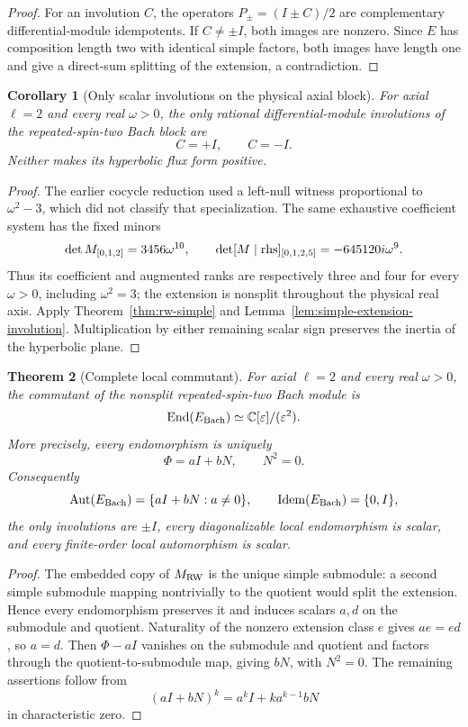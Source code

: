 \documentclass[11pt]{article}
\newtheorem{theorem}{Theorem}[section]
\newtheorem{corollary}[theorem]{Corollary}
\theoremstyle{definition}
\theoremstyle{remark}
\newcommand{\C}{\mathbb C}
\begin{document}
\begin{proof}
For an involution \(C\), the operators
\(P_\pm=(I\pm C)/2\) are complementary differential-module idempotents.
If \(C\ne\pm I\), both images are nonzero.  Since \(E\) has composition
length two with identical simple factors, both images have length one and
give a direct-sum splitting of the extension, a contradiction.
\end{proof}

\begin{corollary}[Only scalar involutions on the physical axial block]
\label{cor:only-scalar-c}
For axial \(\ell=2\) and every real \(\omega>0\), the only rational
differential-module involutions of the repeated-spin-two Bach block are
\[
C=+I,\qquad C=-I.
\]
Neither makes its hyperbolic flux form positive.
\end{corollary}

\begin{proof}
The earlier cocycle reduction used a left-null witness proportional to
\(\omega^2-3\), which did not classify that specialization.  The same
exhaustive coefficient system has the fixed minors
\[
\det M_{[0,1,2]}=3456\omega^{10},
\qquad
\det[M\mid{\rm rhs}]_{[0,1,2,5]}
=-645120i\omega^9.
\]
Thus its coefficient and augmented ranks are respectively three and four
for every \(\omega>0\), including \(\omega^2=3\); the extension is nonsplit
throughout the physical real axis.  Apply
Theorem~\ref{thm:rw-simple} and
Lemma~\ref{lem:simple-extension-involution}.  Multiplication by either
remaining scalar sign preserves the inertia of the hyperbolic plane.
\end{proof}

\begin{theorem}[Complete local commutant]
\label{thm:local-commutant}
For axial \(\ell=2\) and every real \(\omega>0\), the commutant of the
nonsplit repeated-spin-two Bach module is
\[
\operatorname{End}(E_{\rm Bach})
\simeq
\C[\varepsilon]/(\varepsilon^2).
\]
More precisely, every endomorphism is uniquely
\[
\Phi=aI+bN,
\qquad
N^2=0.
\]
Consequently
\[
\operatorname{Aut}(E_{\rm Bach})
=\{aI+bN:a\ne0\},
\qquad
\operatorname{Idem}(E_{\rm Bach})=\{0,I\},
\]
the only involutions are \(\pm I\), every diagonalizable local endomorphism
is scalar, and every finite-order local automorphism is scalar.
\end{theorem}

\begin{proof}
The embedded copy of \(M_{\rm RW}\) is the unique simple submodule: a second
simple submodule mapping nontrivially to the quotient would split the
extension.  Hence every endomorphism preserves it and induces scalars
\(a,d\) on the submodule and quotient.  Naturality of the nonzero extension
class \(e\) gives \(ae=ed\), so \(a=d\).  Then \(\Phi-aI\) vanishes on the
submodule and quotient and factors through the quotient-to-submodule map,
giving \(bN\), with \(N^2=0\).  The remaining assertions follow from
\[
(aI+bN)^k=a^kI+ka^{k-1}bN
\]
in characteristic zero.
\end{proof}
\end{document}
